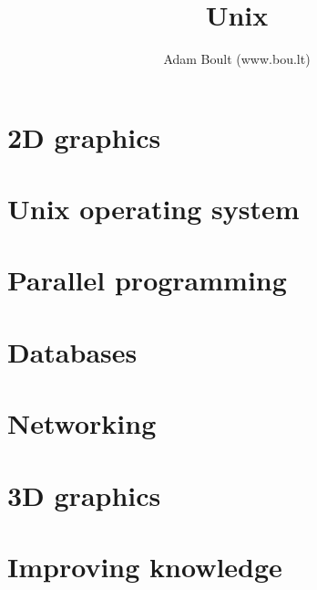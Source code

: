 \documentclass[oneside]{book}
\begin{document}
\author{Adam Boult (www.bou.lt)}
\title{Unix}
\maketitle

\setcounter{tocdepth}{0}
\tableofcontents





\part{2D graphics}






\part{Unix operating system}


\part{Parallel programming}


\part{Databases}




\part{Networking}

\part{3D graphics}







\part{Improving knowledge}


\end{document}
